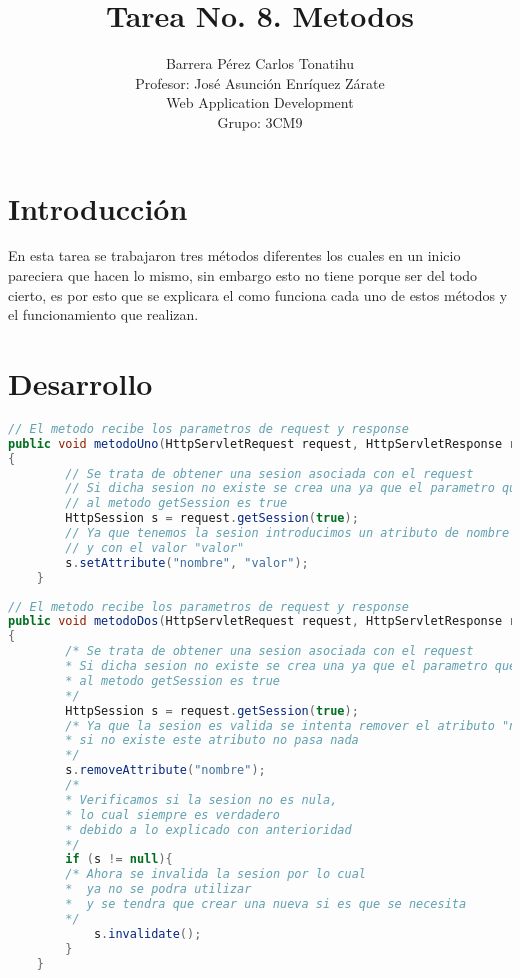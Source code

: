 \documentclass[a4paper,12pt]{article}
\title{Tarea No. 8. Metodos}
\author{Barrera Pérez Carlos Tonatihu \\ Profesor: José Asunción Enríquez 
Zárate \\ Web Application Development \\ Grupo: 3CM9 }
\begin{document}
\maketitle
\newpage
\tableofcontents
\newpage


\section{Introducción}
En esta tarea se trabajaron tres métodos diferentes los cuales en un inicio 
pareciera que hacen lo mismo, sin embargo esto no tiene porque ser del todo 
cierto, es por esto que se explicara el como funciona cada uno de estos métodos 
y el funcionamiento que realizan.
\section{Desarrollo}

\begin{lstlisting}[language=Java, style=customJava, 
caption={Método Uno}, captionpos=b, basicstyle=\fontfamily{cmss}\small]
// El metodo recibe los parametros de request y response
public void metodoUno(HttpServletRequest request, HttpServletResponse response) 
{
        // Se trata de obtener una sesion asociada con el request
        // Si dicha sesion no existe se crea una ya que el parametro que se pasa
        // al metodo getSession es true
        HttpSession s = request.getSession(true);
        // Ya que tenemos la sesion introducimos un atributo de nombre "nombre" 
        // y con el valor "valor"
        s.setAttribute("nombre", "valor");
    }
\end{lstlisting}

\begin{lstlisting}[language=Java, style=customJava, 
caption={Método Dos}, captionpos=b, basicstyle=\fontfamily{cmss}\small]
// El metodo recibe los parametros de request y response
public void metodoDos(HttpServletRequest request, HttpServletResponse response) 
{
        /* Se trata de obtener una sesion asociada con el request
        * Si dicha sesion no existe se crea una ya que el parametro que se pasa
        * al metodo getSession es true
        */
        HttpSession s = request.getSession(true);
        /* Ya que la sesion es valida se intenta remover el atributo "nombre"
        * si no existe este atributo no pasa nada
        */
        s.removeAttribute("nombre");
        /*
        * Verificamos si la sesion no es nula, 
        * lo cual siempre es verdadero
        * debido a lo explicado con anterioridad
        */
        if (s != null){
        /* Ahora se invalida la sesion por lo cual 
        *  ya no se podra utilizar
        *  y se tendra que crear una nueva si es que se necesita
        */
            s.invalidate();
        }
    }
\end{lstlisting}
\end{document}
